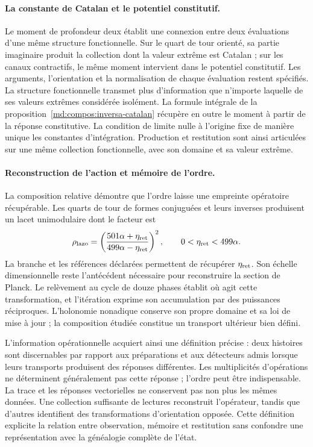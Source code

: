 \paragraph{La constante de Catalan et le potentiel constitutif.}
Le moment de profondeur deux établit une connexion entre deux évaluations
d’une même structure fonctionnelle. Sur le
quart de tour orienté, sa partie imaginaire produit la collection dont la
valeur extrême est Catalan ; sur les canaux contractifs, le même
moment intervient dans le potentiel constitutif. Les arguments,
l’orientation et la normalisation de chaque évaluation restent spécifiés.
La structure fonctionnelle transmet plus d’information que n’importe laquelle de ses
valeurs extrêmes considérée isolément.
La formule intégrale de la proposition~\ref{md:compos:inversa-catalan}
récupère en outre le moment à partir de la réponse constitutive. La condition
de limite nulle à l’origine fixe de manière unique les constantes d’intégration.
Production et restitution sont ainsi articulées sur une même collection
fonctionnelle, avec son domaine et sa valeur extrême.

\newpage
\paragraph{Reconstruction de l’action et mémoire de l’ordre.}
La composition relative démontre que l’ordre laisse
une empreinte opératoire récupérable. Les quarts de tour de formes
conjuguées et leurs inverses produisent un lacet unimodulaire dont le facteur est
\[
 \rho_{\rm lazo}=
 \left(\frac{501\alpha+\eta_{\rm ret}}
 {499\alpha-\eta_{\rm ret}}\right)^2,
 \qquad 0<\eta_{\rm ret}<499\alpha.
\]
La branche et les références déclarées permettent de récupérer
\(\eta_{\rm ret}\). Son échelle dimensionnelle reste l’antécédent
nécessaire pour reconstruire la section de Planck. Le relèvement au
cycle de douze phases établit où agit cette transformation, et
l’itération exprime son accumulation par des puissances réciproques.
L’holonomie nonadique conserve son propre domaine et sa loi de mise à jour ;
la composition étudiée constitue un transport ultérieur bien défini.

L’information opérationnelle acquiert ainsi une définition précise : deux
histoires sont discernables par rapport aux préparations et aux
détecteurs admis lorsque leurs transports produisent des réponses
différentes. Les multiplicités d’opérations ne déterminent généralement pas
cette réponse ; l’ordre peut être indispensable. La trace et les réponses
vectorielles ne conservent pas non plus les mêmes données. Une collection suffisante
de lectures reconstruit l’opérateur, tandis que d’autres identifient des
transformations d’orientation opposée. Cette définition explicite
la relation entre observation, mémoire et restitution sans confondre une
représentation avec la généalogie complète de l’état.

